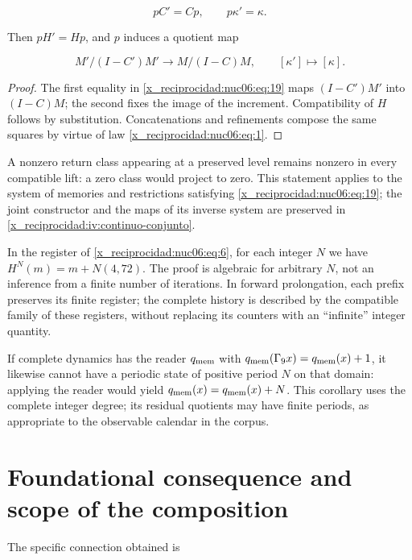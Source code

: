 \begin{equation}
pC'=Cp,\qquad p\kappa'=\kappa.
\label{x_reciprocidad:nuc06:eq:19}
\end{equation}

Then \(pH'=Hp\), and \(p\) induces a quotient map

\begin{equation}
M'/(I-C')M'\longrightarrow M/(I-C)M,
\qquad [\kappa']\longmapsto[\kappa].
\label{x_reciprocidad:nuc06:eq:20}
\end{equation}

\begin{proof}
The first equality in \eqref{x_reciprocidad:nuc06:eq:19} maps \((I-C')M'\) into \((I-C)M\); the second fixes the image of the increment. Compatibility of \(H\) follows by substitution. Concatenations and refinements compose the same squares by virtue of law \eqref{x_reciprocidad:nuc06:eq:1}.
\end{proof}

A nonzero return class appearing at a preserved level remains nonzero in every compatible lift: a zero class would project to zero. This statement applies to the system of memories and restrictions satisfying \eqref{x_reciprocidad:nuc06:eq:19}; the joint constructor and the maps of its inverse system are preserved in \cref{x_reciprocidad:iv:continuo-conjunto}.

In the register of \eqref{x_reciprocidad:nuc06:eq:6}, for each integer \(N\) we have \(H^N(m)=m+N(4,72)\). The proof is algebraic for arbitrary \(N\), not an inference from a finite number of iterations. In forward prolongation, each prefix preserves its finite register; the complete history is described by the compatible family of these registers, without replacing its counters with an “infinite” integer quantity.

If complete dynamics has the reader \(q_{\rm mem}\) with \(q_{\rm mem}(\Gamma_9x)=q_{\rm mem}(x)+1\), it likewise cannot have a periodic state of positive period \(N\) on that domain: applying the reader would yield \(q_{\rm mem}(x)=q_{\rm mem}(x)+N\). This corollary uses the complete integer degree; its residual quotients may have finite periods, as appropriate to the observable calendar in the corpus.

\section{Foundational consequence and scope of the composition}

The specific connection obtained is

